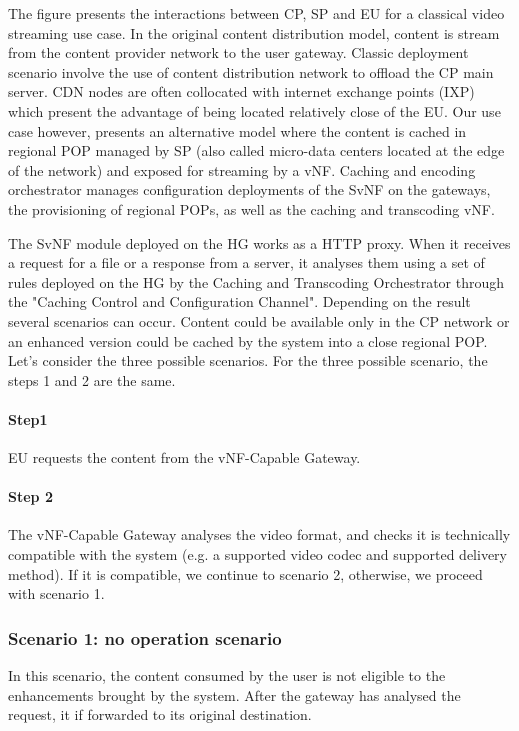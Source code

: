The figure presents the interactions between CP, SP and EU for a classical video streaming use case.
In the original content distribution model, content is stream from the content provider network to the user gateway.
Classic deployment scenario involve the use of content distribution network to offload the CP main server.
CDN nodes are often collocated with internet exchange points (IXP) which present the advantage of being located relatively close of the EU.
Our use case however, presents an alternative model where the content is cached in regional POP managed by SP (also called micro-data centers located at the edge of the network) and exposed for streaming by a vNF.
Caching and encoding orchestrator manages configuration deployments of the SvNF on the gateways, the provisioning of regional POPs, as well as the caching and transcoding vNF.

The SvNF module deployed on the HG works as a HTTP proxy.
When it receives a request for a file or a response from a server, it analyses them using a set of rules deployed on the HG by the Caching and Transcoding Orchestrator through the "Caching Control and Configuration Channel".
Depending on the result several scenarios can occur.
Content could be available only in the CP network or an enhanced version could be cached by the system into a close regional POP.
Let's consider the three possible scenarios.
For the three possible scenario, the steps 1 and 2 are the same. 

\paragraph{Step1}EU requests the content from the vNF-Capable Gateway. 
\paragraph{Step 2}
The vNF-Capable Gateway analyses the video format, and checks it is technically compatible with the system (e.g. a supported video codec and supported delivery method).
If it is compatible, we continue to scenario 2, otherwise, we proceed with scenario 1.

\subsubsection*{Scenario 1: no operation scenario}

In this scenario, the content consumed by the user is not eligible to the enhancements brought by the system.
After the gateway has analysed the request, it if forwarded to its original destination.

